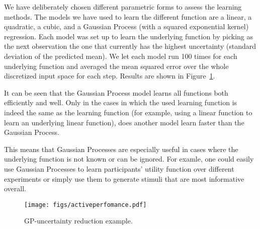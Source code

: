 \documentclass[authoryear,11pt,review]{elsarticle}
\begin{document}
We have deliberately chosen different parametric forms to assess the learning methods. The models we have used to learn the different function are a linear, a quadratic, a cubic, and a Gaussian Process (with a squared exponential kernel) regression. Each model was set up to learn the underlying function by picking as the next observation the one that currently has the highest uncertainty (standard deviation of the predicted mean). We let each model run 100 times for each underlying function and averaged the mean squared error over the whole discretized input space for each step. Results are shown in Figure~\ref{perfomance}.

It can be seen that the Gaussian Process model learns all functions both efficiently and well. Only in the cases in which the used learning function is indeed the same as the learning function (for example, using a linear function to learn an underlying linear function), does another model learn faster than the Gaussian Process.

This means that Gaussian Processes are especially useful in cases where the underlying function is not known or can be ignored. For examle, one could easily use Gaussian Processes to learn participants' utility function over different experiments or simply use them to generate stimuli that are most informative overall. 

\FloatBarrier
\begin{figure}[ht]
 \caption{GP-uncertainty reduction example.}
\label{perfomance}
  \centering
    \texttt{[image: figs/activeperfomance.pdf]}
\end{figure}
\FloatBarrier

\end{document}
